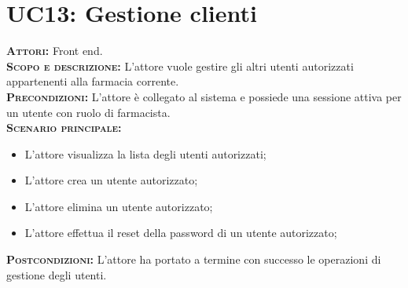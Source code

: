\section{UC13: Gestione clienti}
\label{sec:UC13}
\textsc{\textbf{Attori:}} Front end.\\
\textsc{\textbf{Scopo e descrizione:}} L'attore vuole gestire gli altri utenti autorizzati appartenenti alla farmacia corrente.\\
\textsc{\textsc{\textbf{Precondizioni:}}} L'attore è collegato al sistema e possiede una sessione attiva per un utente con ruolo di farmacista.\\
\textsc{\textbf{Scenario principale:}}
\begin{itemize}
    \item L'attore visualizza la lista degli utenti autorizzati;
    \item L'attore crea un utente autorizzato;
    \item L'attore elimina un utente autorizzato;
    \item L'attore effettua il reset della password di un utente autorizzato;
\end{itemize}
\textsc{\textbf{Postcondizioni:}} L'attore ha portato a termine con successo le operazioni di gestione degli utenti.